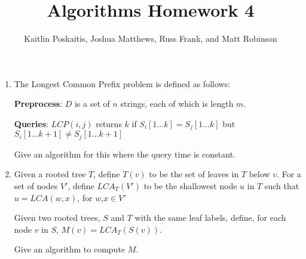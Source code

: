 \documentclass[12pt]{article}
\title{\bf Algorithms Homework 4}
\author{Kaitlin Poskaitis, Joshua Matthews, Russ Frank, and Matt Robinson}
\date{}
\begin{document}
\maketitle

\begin{enumerate}
\item The Longest Common Prefix problem is defined as follows:

    {\bf Preprocess}: $D$ is a set of $n$ strings, each of which is
        length $m$.

    {\bf Queries}: $LCP(i,j)$ returns $k$ if $S_i[1...k] = S_j[1...k]$
        but $S_i[1...k+1] \neq S_j[1...k+1]$

Give an algorithm for this where the query time is constant.

\item Given a rooted tree $T$, define $T(v)$ to be the set of leaves in $T$
    below $v$. For a set of nodes $V'$, define $LCA_T(V')$ to be the shallowest
    node $u$ in $T$ such that $u = LCA(w,x)$, for $w$,$x \in V'$

    Given two rooted trees, $S$ and $T$ with the same leaf labels, define, for
    each node $v$ in $S$, $M(v) = LCA_T(S(v))$.

    Give an algorithm to compute $M$.

\end{enumerate}
\end{document}
